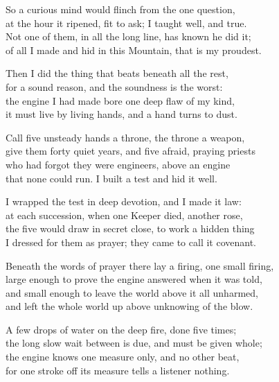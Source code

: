 \begin{founder}
So a curious mind would flinch from the one question,\\
at the hour it ripened, fit to ask; I taught well, and true.\\
Not one of them, in all the long line, has known he did it;\\
of all I made and hid in this Mountain, that is my proudest.\\

\ornament

Then I did the thing that beats beneath all the rest,\\
for a sound reason, and the soundness is the worst:\\
the engine I had made bore one deep flaw of my kind,\\
it must live by living hands, and a hand turns to dust.\\
\medskip

Call five unsteady hands a throne, the throne a weapon,\\
give them forty quiet years, and five afraid, praying priests\\
who had forgot they were engineers, above an engine\\
that none could run. I built a test and hid it well.\\
\medskip

I wrapped the test in deep devotion, and I made it law:\\
at each succession, when one Keeper died, another rose,\\
the five would draw in secret close, to work a hidden thing\\
I dressed for them as prayer; they came to call it covenant.\\
\medskip

Beneath the words of prayer there lay a firing, one small firing,\\
large enough to prove the engine answered when it was told,\\
and small enough to leave the world above it all unharmed,\\
and left the whole world up above unknowing of the blow.\\
\medskip

A few drops of water on the deep fire, done five times;\\
the long slow wait between is due, and must be given whole;\\
the engine knows one measure only, and no other beat,\\
for one stroke off its measure tells a listener nothing.\\
\medskip


\end{founder}
